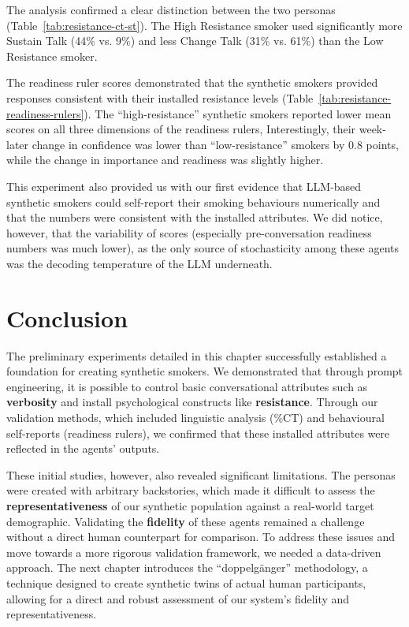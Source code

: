The analysis confirmed a clear distinction between the two personas (Table~\ref{tab:resistance-ct-st}). The High Resistance smoker used significantly more Sustain Talk (44\% vs. 9\%) and less Change Talk (31\% vs. 61\%) than the Low Resistance smoker.


The readiness ruler scores demonstrated that the synthetic smokers provided responses consistent with their installed resistance levels (Table~\ref{tab:resistance-readiness-rulers}). The ``high-resistance'' synthetic smokers reported lower mean scores on all three dimensions of the readiness rulers, Interestingly, their week-later change in confidence was lower than ``low-resistance'' smokers by 0.8 points, while the change in importance and readiness was slightly higher.




This experiment also provided us with our first evidence that LLM-based synthetic smokers could self-report their smoking behaviours numerically and that the numbers were consistent with the installed attributes. We did notice, however, that the variability of scores (especially pre-conversation readiness numbers was much lower), as the only source of stochasticity among these agents was the decoding temperature of the LLM underneath.



\section{Conclusion}
\label{sec:prelim-conclusion}

The preliminary experiments detailed in this chapter successfully established a foundation for creating synthetic smokers. We demonstrated that through prompt engineering, it is possible to control basic conversational attributes such as \textbf{verbosity} and install psychological constructs like \textbf{resistance}. Through our validation methods, which included linguistic analysis (\%CT) and behavioural self-reports (readiness rulers), we confirmed that these installed attributes were reflected in the agents' outputs.

These initial studies, however, also revealed significant limitations. The personas were created with arbitrary backstories, which made it difficult to assess the \textbf{representativeness} of our synthetic population against a real-world target demographic. Validating the \textbf{fidelity} of these agents remained a challenge without a direct human counterpart for comparison. To address these issues and move towards a more rigorous validation framework, we needed a data-driven approach. The next chapter introduces the ``doppelgänger'' methodology, a technique designed to create synthetic twins of actual human participants, allowing for a direct and robust assessment of our system's fidelity and representativeness.